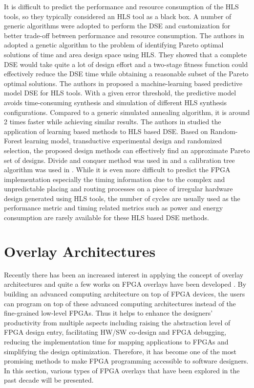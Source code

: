 It is difficult to predict the performance and resource consumption of the HLS tools, so they typically considered an HLS tool as a black box. A number of generic algorithms were adopted to perform the DSE and customization for better trade-off between performance and resource consumption. The authors in \cite{holzer2007design} adopted a genetic algorithm to the problem of identifying Pareto optimal solutions of time and area design space using HLS. They showed that a complete DSE would take quite a lot of design effort and a two-stage fitness function could effectively reduce the DSE time while obtaining a reasonable subset of the Pareto optimal solutions. The authors in \cite{schafer2012machine} proposed a machine-learning based predictive model DSE for HLS tools. With a given error threshold, the predictive model avoids time-consuming synthesis and simulation of different HLS synthesis configurations. Compared to a generic simulated annealing algorithm, it is around 2 times faster while achieving similar results. The authors in \cite{liu2013learning} studied the application of learning based methods to HLS based DSE. Based on Random-Forest learning model, transductive experimental design and randomized selection, the proposed design methods can effectively find an approximate Pareto set of designs. Divide and conquer method was used in \cite{schafer2012divide} and a calibration tree algorithm was used in \cite{kurek2014automating}. While it is even more difficult to predict the FPGA implementation especially the timing information due to the complex and unpredictable placing and routing processes on a piece of irregular hardware design generated using HLS tools, the number of cycles are usually used as the performance metric and timing related metrics such as power and energy consumption are rarely available for these HLS based DSE methods.

\section{Overlay Architectures}
Recently there has been an increased interest in applying the concept of overlay architectures and quite a few works on FPGA overlays have been developed \cite{lysecky2005firm, brant2012ZUMA, grant2011malibu, coole2010intermediate, koch2013efficient, ferreira2011fpga, shukla2006quku, lin2012energy, capalijia2013pipelined, microblaze, nios, cheah2012iDEA, laforest2012OCTAVO, yiannacouras2007exploration, anjam2010vliw,hannig2014invasive, boppu2014compact, yiannacouras2009fine, guy2012VENICE, buciak2007lightweight, liu2004fpga}. By building an advanced computing architecture on top of FPGA devices, the users can program on top of these advanced computing architectures instead of the fine-grained low-level FPGAs. Thus it helps to enhance the designers' productivity from multiple aspects including raising the abstraction level of FPGA design entry, facilitating HW/SW co-design and FPGA debugging, reducing the implementation time for mapping applications to FPGAs and simplifying the design optimization. Therefore, it has become one of the most promising methods to make FPGA programming accessible to software designers. In this section, various types of FPGA overlays that have been explored in the past decade will be presented.

